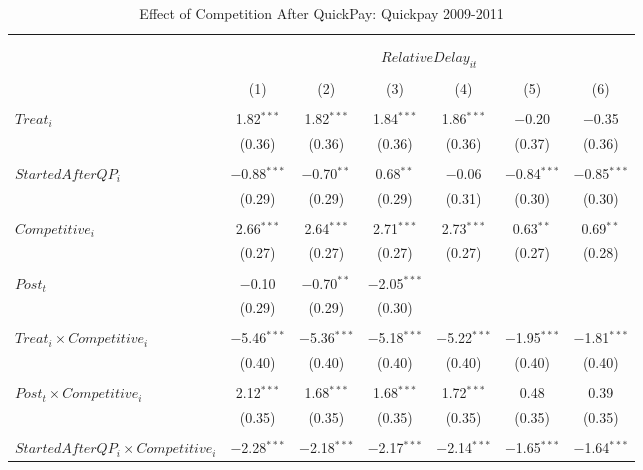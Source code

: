 \documentclass[
]{article}
\begin{document}
\begin{table}[H] \centering 
  \caption{Effect of Competition After QuickPay: Quickpay 2009-2011} 
  \label{} 
\small 
\begin{tabular}{@{\extracolsep{-3pt}}lcccccc} 
\\[-1.8ex]\hline 
\hline \\[-1.8ex] 
\\[-1.8ex] & \multicolumn{6}{c}{$RelativeDelay_{it}$  } \\ 
\\[-1.8ex] & (1) & (2) & (3) & (4) & (5) & (6)\\ 
\hline \\[-1.8ex] 
 $Treat_i$ & 1.82$^{***}$ & 1.82$^{***}$ & 1.84$^{***}$ & 1.86$^{***}$ & $-$0.20 & $-$0.35 \\ 
  & (0.36) & (0.36) & (0.36) & (0.36) & (0.37) & (0.36) \\ 
  & & & & & & \\ 
 $StartedAfterQP_i$ & $-$0.88$^{***}$ & $-$0.70$^{**}$ & 0.68$^{**}$ & $-$0.06 & $-$0.84$^{***}$ & $-$0.85$^{***}$ \\ 
  & (0.29) & (0.29) & (0.29) & (0.31) & (0.30) & (0.30) \\ 
  & & & & & & \\ 
 $Competitive_i$ & 2.66$^{***}$ & 2.64$^{***}$ & 2.71$^{***}$ & 2.73$^{***}$ & 0.63$^{**}$ & 0.69$^{**}$ \\ 
  & (0.27) & (0.27) & (0.27) & (0.27) & (0.27) & (0.28) \\ 
  & & & & & & \\ 
 $Post_t$ & $-$0.10 & $-$0.70$^{**}$ & $-$2.05$^{***}$ &  &  &  \\ 
  & (0.29) & (0.29) & (0.30) &  &  &  \\ 
  & & & & & & \\ 
 $Treat_i \times Competitive_i$ & $-$5.46$^{***}$ & $-$5.36$^{***}$ & $-$5.18$^{***}$ & $-$5.22$^{***}$ & $-$1.95$^{***}$ & $-$1.81$^{***}$ \\ 
  & (0.40) & (0.40) & (0.40) & (0.40) & (0.40) & (0.40) \\ 
  & & & & & & \\ 
 $Post_t \times Competitive_i$ & 2.12$^{***}$ & 1.68$^{***}$ & 1.68$^{***}$ & 1.72$^{***}$ & 0.48 & 0.39 \\ 
  & (0.35) & (0.35) & (0.35) & (0.35) & (0.35) & (0.35) \\ 
  & & & & & & \\ 
 $StartedAfterQP_i \times Competitive_i$ & $-$2.28$^{***}$ & $-$2.18$^{***}$ & $-$2.17$^{***}$ & $-$2.14$^{***}$ & $-$1.65$^{***}$ & $-$1.64$^{***}$ \\ 

\end{tabular}
\end{table}
\end{document}
